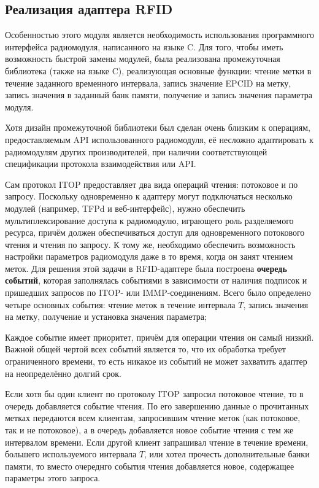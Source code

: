 \subsection{Реализация адаптера RFID}

Особенностью этого модуля является необходимость использования программного интерфейса радиомодуля, написанного на языке C. Для того, чтобы иметь возможность быстрой замены модулей, была реализована промежуточная библиотека (также на языке C), реализующая основные функции: чтение метки в течение заданного временного интервала, запись значение EPCID на метку, запись значения в заданный банк памяти, получение и запись значения параметра модуля.

Хотя дизайн промежуточной библиотеки был сделан очень близким к операциям, предоставляемым API использованного радиомодуля, её несложно адаптировать к радиомодулям других производителей, при наличии соответствующей спецификации протокола взаимодействия или API.

Сам протокол ITOP предоставляет два вида операций чтения: потоковое и по запросу. Поскольку одновременно к адаптеру могут подключаться несколько модулей (например, TFPd и веб-интерфейс), нужно обеспечить мультиплексирование доступа к радиомодулю, играющего роль разделяемого ресурса, причём должен обеспечиваться доступ для одновременного потокового чтения и чтения по запросу. К тому же, необходимо обеспечить возможность настройки параметров радиомодуля даже в то время, когда он занят чтением меток. Для решения этой задачи в RFID-адаптере была построена \textbf{очередь событий}, которая заполнялась событиями в зависимости от наличия подписок и пришедших запросов по ITOP- или IMMP-соединениям. Всего было определено четыре основных события: чтение меток в течение интервала $T$, запись значения на метку, получение и установка значения параметра;

Каждое событие имеет приоритет, причём для операции чтения он самый низкий. Важной общей чертой всех событий является то, что их обработка требует ограниченного времени, то есть никакое из событий не может захватить адаптер на неопределённо долгий срок.

Если хотя бы один клиент по протоколу ITOP запросил потоковое чтение, то в очередь добавляется событие чтения. По его завершению данные о прочитанных метках передаются всем клиентам, запросившим чтение меток (как потоковое, так и не потоковое), а в очередь добавляется новое событие чтения с тем же интервалом времени. Если другой клиент запрашивал чтение в течение времени, большего используемого интервала $T$, или хотел прочесть дополнительные банки памяти, то вместо очереднго события чтения добавляется новое, содержащее параметры этого запроса.


